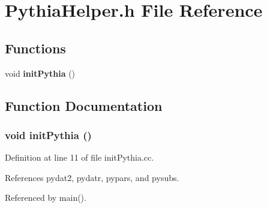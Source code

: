 \section{Pythia\-Helper.h File Reference}
\label{PythiaHelper_8h}
\subsection*{Functions}
\begin{CompactItemize}
\item 
void {\bf init\-Pythia} ()
\end{CompactItemize}


\subsection{Function Documentation}
\subsubsection{\setlength{\rightskip}{0pt plus 5cm}void init\-Pythia ()}\label{PythiaHelper_8h_ad69b06fecb6fbe240681e20c675e687}




Definition at line 11 of file init\-Pythia.cc.

References pydat2, pydatr, pypars, and pysubs.

Referenced by main().